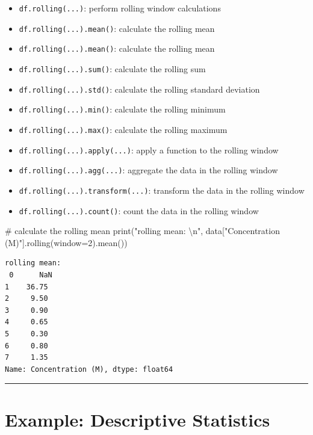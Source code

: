 \documentclass[
  letterpaper,
  DIV=11,
  numbers=noendperiod]{scrreprt}
\newenvironment{Shaded}{\begin{snugshade}}{\end{snugshade}}
\newcommand{\BuiltInTok}[1]{\textcolor[rgb]{0.00,0.23,0.31}{#1}}
\newcommand{\CharTok}[1]{\textcolor[rgb]{0.13,0.47,0.30}{#1}}
\newcommand{\CommentTok}[1]{\textcolor[rgb]{0.37,0.37,0.37}{#1}}
\newcommand{\DecValTok}[1]{\textcolor[rgb]{0.68,0.00,0.00}{#1}}
\newcommand{\NormalTok}[1]{\textcolor[rgb]{0.00,0.23,0.31}{#1}}
\newcommand{\OperatorTok}[1]{\textcolor[rgb]{0.37,0.37,0.37}{#1}}
\newcommand{\StringTok}[1]{\textcolor[rgb]{0.13,0.47,0.30}{#1}}
\providecommand{\tightlist}{%
  \setlength{\itemsep}{0pt}\setlength{\parskip}{0pt}}\usepackage{longtable,booktabs,array}
\begin{document}
\begin{itemize}
\tightlist
\item
  \texttt{df.rolling(...)}: perform rolling window calculations
\item
  \texttt{df.rolling(...).mean()}: calculate the rolling mean
\item
  \texttt{df.rolling(...).mean()}: calculate the rolling mean
\item
  \texttt{df.rolling(...).sum()}: calculate the rolling sum
\item
  \texttt{df.rolling(...).std()}: calculate the rolling standard
  deviation
\item
  \texttt{df.rolling(...).min()}: calculate the rolling minimum
\item
  \texttt{df.rolling(...).max()}: calculate the rolling maximum
\item
  \texttt{df.rolling(...).apply(...)}: apply a function to the rolling
  window
\item
  \texttt{df.rolling(...).agg(...)}: aggregate the data in the rolling
  window
\item
  \texttt{df.rolling(...).transform(...)}: transform the data in the
  rolling window
\item
  \texttt{df.rolling(...).count()}: count the data in the rolling window
\end{itemize}

\begin{Shaded}
\begin{Highlighting}[]
\CommentTok{\# calculate the rolling mean}
\BuiltInTok{print}\NormalTok{(}\StringTok{"rolling mean: }\CharTok{\textbackslash{}n}\StringTok{"}\NormalTok{, data[}\StringTok{"Concentration (M)"}\NormalTok{].rolling(window}\OperatorTok{=}\DecValTok{2}\NormalTok{).mean())}
\end{Highlighting}
\end{Shaded}

\begin{verbatim}
rolling mean: 
 0      NaN
1    36.75
2     9.50
3     0.90
4     0.65
5     0.30
6     0.80
7     1.35
Name: Concentration (M), dtype: float64
\end{verbatim}

\begin{center}\rule{0.5\linewidth}{0.5pt}\end{center}

\section*{Example: Descriptive
Statistics}\label{example-descriptive-statistics}
\end{document}
